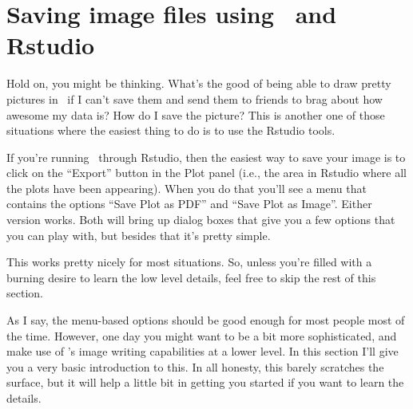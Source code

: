 \section{Saving image files using \R\ and Rstudio~\label{sec:saveimage}}

Hold on, you might be thinking. What's the good of being able to draw pretty pictures in \R\ if I can't save them and send them to friends to brag about how awesome my data is? How do I save the picture? This is another one of those situations where the easiest thing to do is to use the Rstudio tools.

If you're running \R\ through Rstudio, then the easiest way to save your image is to click on the ``Export'' button in the Plot panel (i.e., the area in Rstudio where all the plots have been appearing). When you do that you'll see a menu that contains the options ``Save Plot as PDF'' and ``Save Plot as Image''. Either version works. Both will bring up dialog boxes that give you a few options that you can play with, but besides that it's pretty simple. 

This works pretty nicely for most situations. So, unless you're filled with a burning desire to learn the low level details, feel free to skip the rest of this section.


As I say, the menu-based options should be good enough for most people most of the time. However, one day you might want to be a bit more sophisticated, and make use of \R's image writing capabilities at a lower level. In this section I'll give you a very basic introduction to this. In all honesty, this barely scratches the surface, but it will help a little bit in getting you started if you want to learn the details. 

